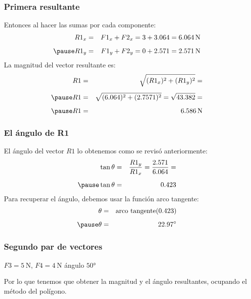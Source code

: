 \documentclass[14pt, xcolor={usenames,dvipsnames}]{beamer}
\begin{document}
\begin{frame}
\frametitle{Primera resultante}
Entonces al hacer las sumas por cada componente:
\begin{eqnarray*}
R1_{x} &=& F1_{x} + F2_{x} = 3 + 3.064 = \SI{6.064}{\newton} \\[0.5em] \pause
R1_{y} &=& F1_{y} + F2_{y} = 0 + 2.571 = \SI{2.571}{\newton}
\end{eqnarray*}
\pause
La magnitud del vector resultante es:
\begin{eqnarray*}
R1 &=& \sqrt{(R1_{x})^{2} + (R1_{y})^{2}} = \\[0.5em] \pause
R1 &=& \sqrt{(6.064)^{2} + (2.7571)^{2}} = \sqrt{43.382} = \\[0.5em] \pause
R1 &=& \SI{6.586}{\newton}
\end{eqnarray*}
\end{frame}
\begin{frame}
\frametitle{El ángulo de R1}
El ángulo del vector $R1$ lo obtenemos como se revisó anteriormente:
\begin{eqnarray*}
\tan \theta &=& \dfrac{R1_{y}}{R1_{x}} = \dfrac{2.571}{6.064} = \\[0.5em] \pause
\tan \theta &=& 0.423
\end{eqnarray*}
\pause
Para recuperar el ángulo, debemos usar la función arco tangente:
\begin{eqnarray*}
\theta &=& \text{arco tangente} (0.423) \\[0.5em] \pause
\theta &=& \ang{22.97}
\end{eqnarray*}
\end{frame}
\begin{frame}
\frametitle{Segundo par de vectores}
$F3 = \SI{5}{\newton}$, $F4 = \SI{4}{\newton}$  ángulo $\ang{50}$
\begin{figure}
\centering
{}
\end{figure}
Por lo que tenemos que obtener la magnitud y el ángulo resultantes, ocupando el método del polígono.
\end{frame}
    
\end{document}
